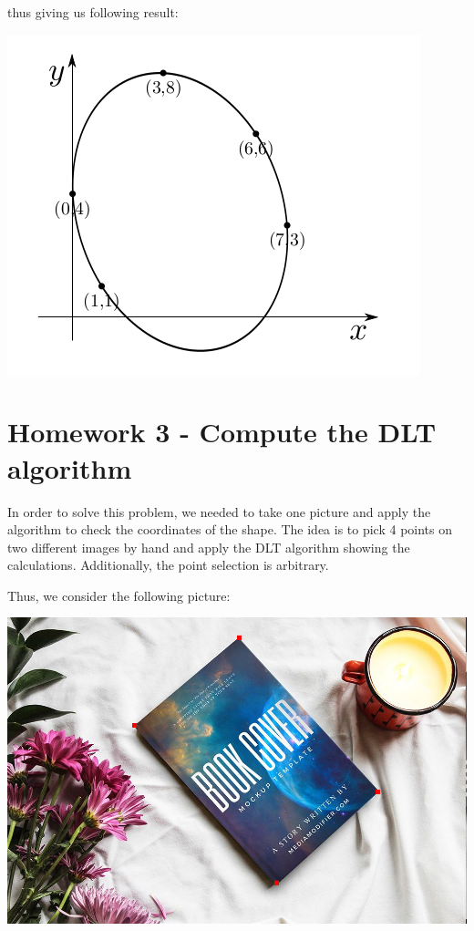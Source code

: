 \documentclass[]{article}
\begin{document}
thus giving us following result:

\centerline {
\includegraphics[scale=0.5]{scr1}
}


\section{Homework 3 - Compute the DLT algorithm}
In order to solve this problem, we needed to take one picture and apply the algorithm to check the coordinates of the shape. The idea is to pick 4 points on two different images by hand and apply the DLT algorithm showing the calculations. Additionally, the point selection is arbitrary. 

Thus, we consider the following picture:

\centerline {
	\includegraphics[scale=0.4]{src}
}
\end{document}
